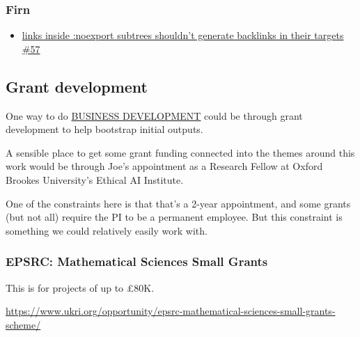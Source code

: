 \documentclass[11pt]{article}
\begin{document}
\subsubsection{Firn}
\label{sec:org6009c40}

\begin{itemize}
\item \href{https://github.com/theiceshelf/firn/issues/57}{links inside :noexport subtrees shouldn't generate backlinks in their targets \#57}
\end{itemize}
\subsection{Grant development}
\label{sec:orgb0de82f}
One way to do \hyperref[sec:org48264b5]{BUSINESS DEVELOPMENT} could be through grant development
to help bootstrap initial outputs.

A sensible place to get some grant funding connected into the themes
around this work would be through Joe’s appointment as a Research
Fellow at Oxford Brookes University’s Ethical AI Institute.

One of the constraints here is that that’s a 2-year appointment, and
some grants (but not all) require the PI to be a permanent employee.
But this constraint is something we could relatively easily work with.

\subsubsection{EPSRC: Mathematical Sciences Small Grants}
\label{sec:org5fa6f60}

This is for projects of up to £80K.

\url{https://www.ukri.org/opportunity/epsrc-mathematical-sciences-small-grants-scheme/}
\end{document}
